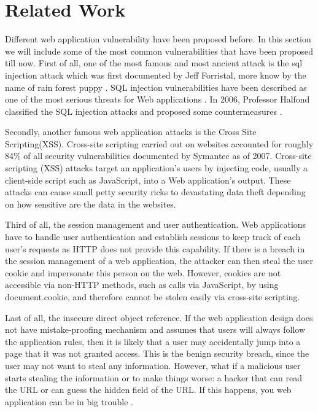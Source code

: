 \documentclass[conference]{IEEEtran}
\begin{document}
%
%
%
\section{Related Work}
Different web application vulnerability have been proposed before. In this section we will include some of the most common 
vulnerabilities that have been proposed till now. First of all, one of the most famous and most ancient attack is the sql injection 
attack which was first documented by Jeff Forristal, more know by the name of rain forest puppy \cite{Jeff}. 
 SQL injection vulnerabilities have been described as one of the most serious threats for Web applications \cite{Aucsmith} \cite{TO}. 
 In 2006, Professor Halfond classified the SQL injection attacks and proposed some countermeasures \cite{halfond06mar}.

Secondly, another famous web application attacks is the Cross Site Scripting(XSS). 
Cross-site scripting carried out on websites accounted for roughly 84\% of all security vulnerabilities documented by Symantec as of 2007\cite{symantec}. 
Cross-site scripting (XSS) attacks target an application's users by injecting code, usually a client-side script such as JavaScript, into a Web application's output. 
These attacks can cause small petty security ricks to devastating data theft depending on how sensitive are the data in the websites.

Third of all, the session management and user authentication. Web applications have to handle user authentication and establish sessions to keep track 
of each user's requests as HTTP does not provide this capability. If there is a breach in the session management of 
a web application, the attacker can then steal the user cookie and impersonate this person on the web. 
However, cookies are not accessible via non-HTTP methods, such as calls via JavaScript, by using document.cookie, and therefore cannot be stolen easily via cross-site scripting\cite{symantec}.

Last of all, the insecure direct object reference. If the web application design does not have mistake-proofing mechanism and assumes that users will always follow the application rules, 
then it is likely that a user may accidentally jump into a page that it was not granted access. This is the benign security breach, since the user may not want to steal any information. 
However, what if a malicious user starts stealing the information or to make things worse: a hacker that can read the URL or can guess the hidden field of the URL\cite{Michael}. 
If this happens, you web application can be in big trouble  \cite{Test}.
\end{document}
